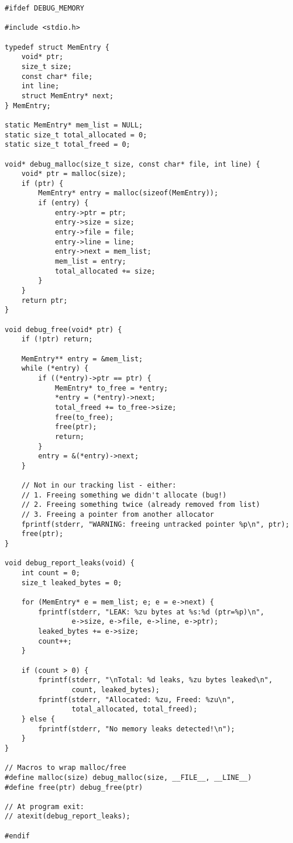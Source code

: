 \begin{lstlisting}
#ifdef DEBUG_MEMORY

#include <stdio.h>

typedef struct MemEntry {
    void* ptr;
    size_t size;
    const char* file;
    int line;
    struct MemEntry* next;
} MemEntry;

static MemEntry* mem_list = NULL;
static size_t total_allocated = 0;
static size_t total_freed = 0;

void* debug_malloc(size_t size, const char* file, int line) {
    void* ptr = malloc(size);
    if (ptr) {
        MemEntry* entry = malloc(sizeof(MemEntry));
        if (entry) {
            entry->ptr = ptr;
            entry->size = size;
            entry->file = file;
            entry->line = line;
            entry->next = mem_list;
            mem_list = entry;
            total_allocated += size;
        }
    }
    return ptr;
}

void debug_free(void* ptr) {
    if (!ptr) return;

    MemEntry** entry = &mem_list;
    while (*entry) {
        if ((*entry)->ptr == ptr) {
            MemEntry* to_free = *entry;
            *entry = (*entry)->next;
            total_freed += to_free->size;
            free(to_free);
            free(ptr);
            return;
        }
        entry = &(*entry)->next;
    }

    // Not in our tracking list - either:
    // 1. Freeing something we didn't allocate (bug!)
    // 2. Freeing something twice (already removed from list)
    // 3. Freeing a pointer from another allocator
    fprintf(stderr, "WARNING: freeing untracked pointer %p\n", ptr);
    free(ptr);
}

void debug_report_leaks(void) {
    int count = 0;
    size_t leaked_bytes = 0;

    for (MemEntry* e = mem_list; e; e = e->next) {
        fprintf(stderr, "LEAK: %zu bytes at %s:%d (ptr=%p)\n",
                e->size, e->file, e->line, e->ptr);
        leaked_bytes += e->size;
        count++;
    }

    if (count > 0) {
        fprintf(stderr, "\nTotal: %d leaks, %zu bytes leaked\n",
                count, leaked_bytes);
        fprintf(stderr, "Allocated: %zu, Freed: %zu\n",
                total_allocated, total_freed);
    } else {
        fprintf(stderr, "No memory leaks detected!\n");
    }
}

// Macros to wrap malloc/free
#define malloc(size) debug_malloc(size, __FILE__, __LINE__)
#define free(ptr) debug_free(ptr)

// At program exit:
// atexit(debug_report_leaks);

#endif
\end{lstlisting}

